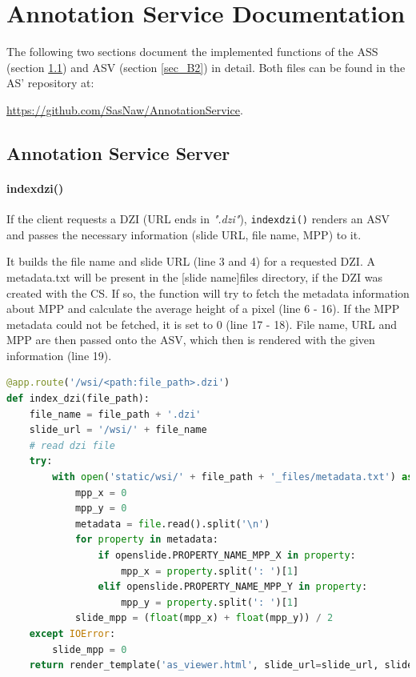 \chapter{Annotation Service Documentation}

The following two sections document the implemented functions of the ASS (section \ref{sec_B1}) and ASV (section \ref{sec_B2}) in detail. Both files can be found in the AS' repository at:

 \url{https://github.com/SasNaw/AnnotationService}.

\section{Annotation Service Server}
\label{sec_B1}

\subsubsection{index{\textunderscore}dzi()}
If the client requests a DZI (URL ends in \emph{".dzi"}), \texttt{index{\textunderscore}dzi()} renders an ASV and passes the necessary information (slide URL, file name, MPP) to it.

It builds the file name and slide URL (line 3 and 4) for a requested DZI. A metadata.txt will be present in the [slide name]{\textunderscore}files directory, if the DZI was created with the CS. If so, the function will try to fetch the metadata information about MPP and calculate the average height of a pixel (line 6 - 16). If the MPP metadata could not be fetched, it is set to 0 (line 17 - 18). File name, URL and MPP are then passed onto the ASV, which then is rendered with the given information (line 19).

\begin{lstlisting}[language=Python, frame=single]
@app.route('/wsi/<path:file_path>.dzi')
def index_dzi(file_path):
	file_name = file_path + '.dzi'
	slide_url = '/wsi/' + file_name
	# read dzi file
	try:
		with open('static/wsi/' + file_path + '_files/metadata.txt') as file:
			mpp_x = 0
			mpp_y = 0
			metadata = file.read().split('\n')
			for property in metadata:
				if openslide.PROPERTY_NAME_MPP_X in property:
					mpp_x = property.split(': ')[1]
				elif openslide.PROPERTY_NAME_MPP_Y in property:
					mpp_y = property.split(': ')[1]
			slide_mpp = (float(mpp_x) + float(mpp_y)) / 2
	except IOError:
		slide_mpp = 0
	return render_template('as_viewer.html', slide_url=slide_url, slide_mpp=slide_mpp, file_name=file_name)
\end{lstlisting}


